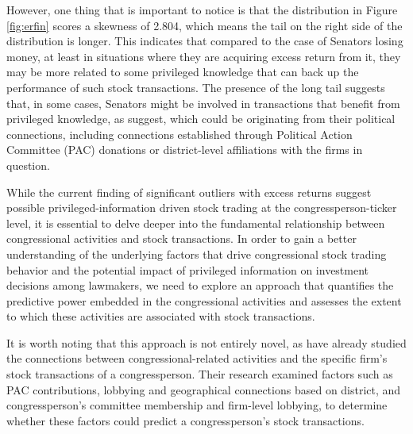 \documentclass[15pt,letterpaper]{article}
\begin{document}
However, one thing that is important to notice is that the distribution in Figure \ref{fig:erfin} scores a skewness of 2.804, which means the tail on the right side of the distribution is longer. This indicates that compared to the case of Senators losing money, at least in situations where they are acquiring excess return from it, they may be more related to some privileged knowledge that can back up the performance of such stock transactions. The presence of the long tail suggests that, in some cases, Senators might be involved in transactions that benefit from privileged knowledge, as \cite{eg14} suggest, which could be originating from their political connections, including connections established through Political Action Committee (PAC) donations or district-level affiliations with the firms in question.


While the current finding of significant outliers with excess returns suggest possible privileged-information driven stock trading at the congressperson-ticker level, it is essential to delve deeper into the fundamental relationship between congressional activities and stock transactions.
In order to gain a better understanding of the underlying factors that drive congressional stock trading behavior and the potential impact of privileged information on investment decisions among lawmakers, we need to explore an approach that quantifies the predictive power embedded in the congressional activities and assesses the extent to which these activities are associated with stock transactions.

It is worth noting that this approach is not entirely novel, as \cite{eg14} have already studied the connections between congressional-related activities and the specific firm's stock transactions of a congressperson. Their research examined factors such as PAC contributions, lobbying and geographical connections based on district, and congressperson's committee membership and firm-level lobbying, to determine whether these factors could predict a congressperson's stock transactions.
\end{document}
